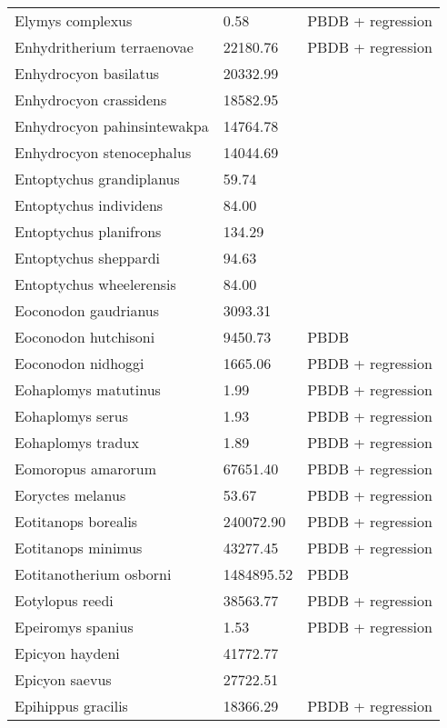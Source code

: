 \documentclass{article}
\begin{document}
\begin{center}
\begin{longtable}{p{} p{} p{}}
    Elymys complexus & 0.58 & PBDB + regression \\ 
    Enhydritherium terraenovae & 22180.76 & PBDB + regression \\ 
    Enhydrocyon basilatus & 20332.99 & \cite{Tomiya2013} \\ 
    Enhydrocyon crassidens & 18582.95 & \cite{Tomiya2013} \\ 
    Enhydrocyon pahinsintewakpa & 14764.78 & \cite{Tomiya2013} \\ 
    Enhydrocyon stenocephalus & 14044.69 & \cite{Tomiya2013} \\ 
    Entoptychus grandiplanus & 59.74 & \cite{Tomiya2013} \\ 
    Entoptychus individens & 84.00 & \cite{McKenna2011} \\ 
    Entoptychus planifrons & 134.29 & \cite{Tomiya2013} \\ 
    Entoptychus sheppardi & 94.63 & \cite{Tomiya2013} \\ 
    Entoptychus wheelerensis & 84.00 & \cite{McKenna2011} \\ 
    Eoconodon gaudrianus & 3093.31 & \cite{Zonneveld2003} \\ 
    Eoconodon hutchisoni & 9450.73 & PBDB \\ 
    Eoconodon nidhoggi & 1665.06 & PBDB + regression \\ 
    Eohaplomys matutinus & 1.99 & PBDB + regression \\ 
    Eohaplomys serus & 1.93 & PBDB + regression \\ 
    Eohaplomys tradux & 1.89 & PBDB + regression \\ 
    Eomoropus amarorum & 67651.40 & PBDB + regression \\ 
    Eoryctes melanus & 53.67 & PBDB + regression \\ 
    Eotitanops borealis & 240072.90 & PBDB + regression \\ 
    Eotitanops minimus & 43277.45 & PBDB + regression \\ 
    Eotitanotherium osborni & 1484895.52 & PBDB \\ 
    Eotylopus reedi & 38563.77 & PBDB + regression \\ 
    Epeiromys spanius & 1.53 & PBDB + regression \\ 
    Epicyon haydeni & 41772.77 & \cite{Tomiya2013} \\ 
    Epicyon saevus & 27722.51 & \cite{Tomiya2013} \\ 
    Epihippus gracilis & 18366.29 & PBDB + regression \\ 

\end{longtable}
\end{center}
\end{document}
